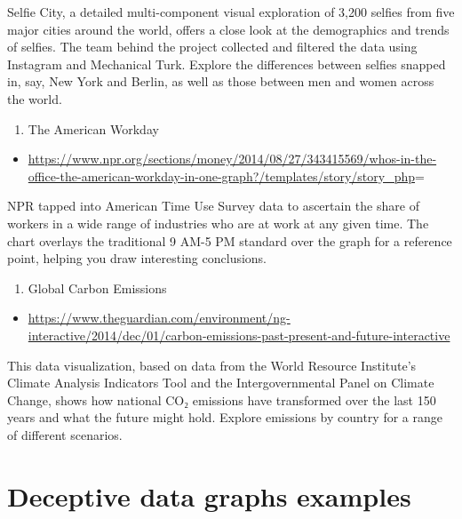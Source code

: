 \documentclass[]{book}
\providecommand{\tightlist}{%
  \setlength{\itemsep}{0pt}\setlength{\parskip}{0pt}}
\theoremstyle{definition}
\theoremstyle{definition}
\theoremstyle{definition}
\theoremstyle{remark}
\begin{document}
Selfie City, a detailed multi-component visual exploration of 3,200
selfies from five major cities around the world, offers a close look at
the demographics and trends of selfies. The team behind the project
collected and filtered the data using Instagram and Mechanical Turk.
Explore the differences between selfies snapped in, say, New York and
Berlin, as well as those between men and women across the world.

\begin{enumerate}
\def\labelenumi{\arabic{enumi}.}
\setcounter{enumi}{13}
\tightlist
\item
  The American Workday
\end{enumerate}

\begin{itemize}
\tightlist
\item
  \url{https://www.npr.org/sections/money/2014/08/27/343415569/whos-in-the-office-the-american-workday-in-one-graph?/templates/story/story_php}=
\end{itemize}

NPR tapped into American Time Use Survey data to ascertain the share of
workers in a wide range of industries who are at work at any given time.
The chart overlays the traditional 9 AM-5 PM standard over the graph for
a reference point, helping you draw interesting conclusions.

\begin{enumerate}
\def\labelenumi{\arabic{enumi}.}
\setcounter{enumi}{14}
\tightlist
\item
  Global Carbon Emissions
\end{enumerate}

\begin{itemize}
\tightlist
\item
  \url{https://www.theguardian.com/environment/ng-interactive/2014/dec/01/carbon-emissions-past-present-and-future-interactive}
\end{itemize}

This data visualization, based on data from the World Resource
Institute's Climate Analysis Indicators Tool and the Intergovernmental
Panel on Climate Change, shows how national CO₂ emissions have
transformed over the last 150 years and what the future might hold.
Explore emissions by country for a range of different scenarios.

\section{Deceptive data graphs
examples}\label{deceptive-data-graphs-examples}
\end{document}
